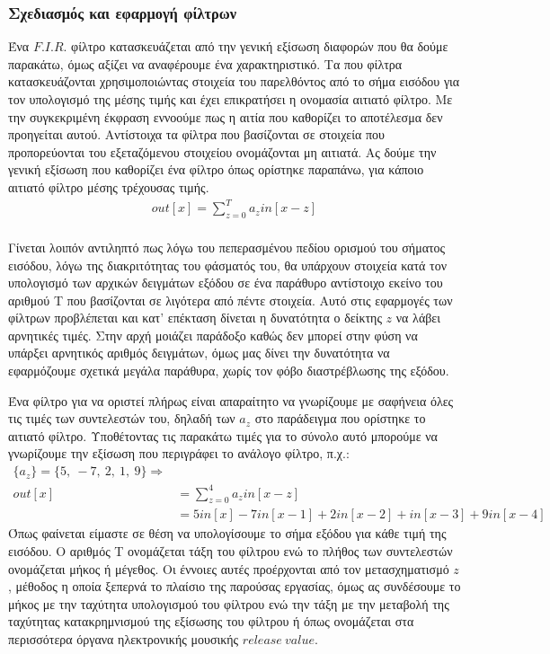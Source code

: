 \documentclass[breaklines=true, 12pt]{article}
\begin{document}
\subsubsection{Σχεδιασμός και εφαρμογή φίλτρων}
\label{sec:org3f05f54}
Ένα \(F.I.R.\) φίλτρο κατασκευάζεται από την γενική εξίσωση διαφορών που θα δούμε παρακάτω,
όμως αξίζει να αναφέρουμε ένα χαρακτηριστικό. Τα που φίλτρα κατασκευάζονται χρησιμοποιώντας
στοιχεία του παρελθόντος από το σήμα εισόδου για τον υπολογισμό της μέσης τιμής και
έχει επικρατήσει η ονομασία αιτιατό φίλτρο. Με την συγκεκριμένη έκφραση εννοούμε πως
η αιτία που καθορίζει το αποτέλεσμα δεν προηγείται αυτού. Αντίστοιχα τα φίλτρα που
βασίζονται σε στοιχεία που προπορεύονται του εξεταζόμενου στοιχείου ονομάζονται μη
αιτιατά. Ας δούμε την γενική εξίσωση που καθορίζει ένα φίλτρο όπως ορίστηκε παραπάνω,
για κάποιο αιτιατό φίλτρο μέσης τρέχουσας τιμής.
\begin{equation}
\begin{align}
out[x] = \sum_{z=0}^{{T}} a_{z} in[x-z] \\
\end{align}
\end{equation}

Γίνεται λοιπόν αντιληπτό πως λόγω του πεπερασμένου πεδίου ορισμού του σήματος εισόδου,
λόγω της διακριτότητας του φάσματός του, θα υπάρχουν στοιχεία κατά τον υπολογισμό των
αρχικών δειγμάτων εξόδου σε ένα παράθυρο αντίστοιχο εκείνο του αριθμού Τ που βασίζονται
σε λιγότερα από πέντε στοιχεία. Αυτό στις εφαρμογές των φίλτρων προβλέπεται και κατ'
επέκταση δίνεται η δυνατότητα ο δείκτης \(z\) να λάβει αρνητικές τιμές. Στην αρχή μοιάζει
παράδοξο καθώς δεν μπορεί στην φύση να υπάρξει αρνητικός αριθμός δειγμάτων, όμως μας
δίνει την δυνατότητα να εφαρμόζουμε σχετικά μεγάλα παράθυρα, χωρίς τον φόβο διαστρέβλωσης
της εξόδου.

Ένα φίλτρο για να οριστεί πλήρως είναι απαραίτητο να γνωρίζουμε με σαφήνεια όλες τις
τιμές των συντελεστών του, δηλαδή των \(a_{z}\) στο παράδειγμα που ορίστηκε το αιτιατό φίλτρο.
Υποθέτοντας τις παρακάτω τιμές για το σύνολο αυτό μπορούμε να γνωρίζουμε την εξίσωση
που περιγράφει το ανάλογο φίλτρο, π.χ.:
\begin{equation}
\begin{align}
\{a_{z}\} = \{5,\ -7,\ 2,\ 1,\ 9\} \Rightarrow \\
out[x] &= \sum_{z=0}^{4}a_{z}in[x-z] \\
&= 5in[x] - 7in[x-1] + 2in[x-2] + in[x-3] +9in[x-4]
\end{align}
\end{equation}
Όπως φαίνεται είμαστε σε θέση να υπολογίσουμε το σήμα εξόδου για κάθε τιμή της εισόδου.
Ο αριθμός Τ ονομάζεται τάξη του φίλτρου ενώ το πλήθος των συντελεστών ονομάζεται μήκος ή
μέγεθος. Οι έννοιες αυτές προέρχονται από τον μετασχηματισμό \(z\), μέθοδος η οποία  ξεπερνά
το πλαίσιο της παρούσας εργασίας, όμως ας συνδέσουμε το μήκος με την ταχύτητα υπολογισμού
του φίλτρου ενώ την τάξη με την μεταβολή της ταχύτητας κατακρημνισμού της εξίσωσης του
φίλτρου ή όπως ονομάζεται στα περισσότερα όργανα ηλεκτρονικής μουσικής \(release\ value\).
\end{document}
